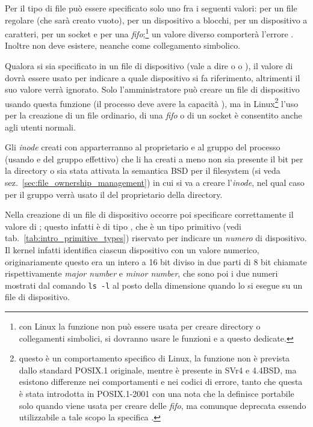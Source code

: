 Per il tipo di file può essere specificato solo uno fra i seguenti valori:
 per un file regolare (che sarà creato vuoto),
 per un dispositivo a blocchi,  per un
dispositivo a caratteri,  per un socket e 
per una \textit{fifo};\footnote{con Linux la funzione non può essere usata per
  creare directory o collegamenti simbolici, si dovranno usare le funzioni
   e  a questo dedicate.} un valore diverso
comporterà l'errore . Inoltre  non deve
esistere, neanche come collegamento simbolico.

Qualora si sia specificato in  un file di dispositivo (vale a dire
o  o ), il valore di  dovrà essere
usato per indicare a quale dispositivo si fa riferimento, altrimenti il suo
valore verrà ignorato.  Solo l'amministratore può creare un file di
dispositivo usando questa funzione (il processo deve avere la capacità
), ma in Linux\footnote{questo è un comportamento specifico
  di Linux, la funzione non è prevista dallo standard POSIX.1 originale,
  mentre è presente in SVr4 e 4.4BSD, ma esistono differenze nei comportamenti
  e nei codici di errore, tanto che questa è stata introdotta in POSIX.1-2001
  con una nota che la definisce portabile solo quando viene usata per creare
  delle \textit{fifo}, ma comunque deprecata essendo utilizzabile a tale scopo
  la specifica .} l'uso per la creazione di un file ordinario, di
una \textit{fifo} o di un socket è consentito anche agli utenti normali.

Gli \textit{inode} creati con  apparterranno al proprietario e al
gruppo del processo (usando  e  del gruppo effettivo) che li
ha creati a meno non sia presente il bit  per la directory o sia
stata attivata la semantica BSD per il filesystem (si veda
sez.~\ref{sec:file_ownership_management}) in cui si va a creare
l'\textit{inode}, nel qual caso per il gruppo verrà usato il  del
proprietario della directory.


Nella creazione di un file di dispositivo occorre poi specificare
correttamente il valore di ; questo infatti è di tipo
, che è un tipo primitivo (vedi
tab.~\ref{tab:intro_primitive_types}) riservato per indicare un
\textsl{numero} di dispositivo. Il kernel infatti identifica ciascun
dispositivo con un valore numerico, originariamente questo era un intero a 16
bit diviso in due parti di 8 bit chiamate rispettivamente \textit{major
  number} e \textit{minor number}, che sono poi i due numeri mostrati dal
comando \texttt{ls -l} al posto della dimensione quando lo si esegue su un
file di dispositivo.

